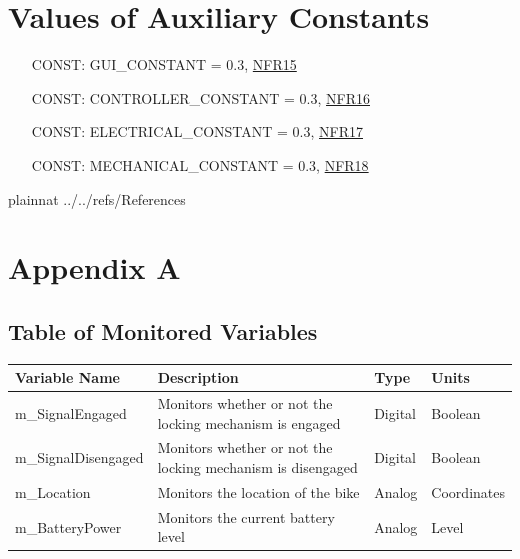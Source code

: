 \documentclass[12pt]{article}
\newcounter{constnum} %
\begin{document}
\section{Values of Auxiliary Constants}

\begin{itemize}
\setlength{\itemindent}{0.5in} \item[CONST\refstepcounter{constnum}\theconstnum\label{LC_meaningfulLabel}:] GUI\_CONSTANT = 0.3, \hyperref[NFRGUI]{NFR15}
\item[CONST\refstepcounter{constnum}\theconstnum\label{LC_meaningfulLabel}:] CONTROLLER\_CONSTANT = 0.3, \hyperref[NFRController]{NFR16}
\item[CONST\refstepcounter{constnum}\theconstnum\label{LC_meaningfulLabel}:] ELECTRICAL\_CONSTANT = 0.3, \hyperref[NFRCircuit]{NFR17}
\item[CONST\refstepcounter{constnum}\theconstnum\label{LC_meaningfulLabel}:] MECHANICAL\_CONSTANT = 0.3, \hyperref[NFRMech]{NFR18}
\end{itemize}

\newpage

 {plainnat}
 {../../refs/References}

\newpage

\newpage{}
\section{Appendix A}

\subsection{Table of Monitored Variables}

\begin{minipage}{\textwidth}
\renewcommand*{\arraystretch}{1.5}
\begin{tabular}{| p{} | p{} | p{} | p{} |}
 \hline
 Variable Name & Description & Type & Units \\ 
 \hline
 m\_SignalEngaged & Monitors whether or not the locking mechanism is engaged & Digital & Boolean \\ 
  \hline
 m\_SignalDisengaged & Monitors whether or not the locking mechanism is disengaged & Digital & Boolean \\ 
  \hline
 m\_Location & Monitors the location of the bike & Analog & Coordinates \\ 
  \hline
 m\_BatteryPower & Monitors the current battery level & Analog & Level \\ 
 \hline
\end{tabular}
\end{minipage}\\
\end{document}
